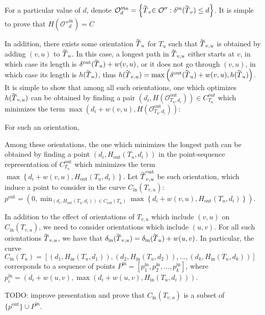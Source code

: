 For a particular value of $d$, denote $\mathcal{O}''^{\text{in}}_{d} = \left\{\tildeb{T}_v \in \mathcal{O}'': \delta^{\text{in}}(\tildeb{T}_v) \leq d\right\}$. It is simple to prove that $H\left(\mathcal{O}''^{\text{in}}_{d}\right) = C$


In addition, there exists some orientation $\tildeb{T}_u$ for $T_u$ such that $\tildeb{T}_{v,u}$  is obtained by adding $(v, u)$ to $\tildeb{T}_u$. In this case, a longest path in $\tildeb{T}_{v,u}$ either starts at $v$, in which case its length is $\delta^\text{out}(\tildeb{T}_u) + w(v,u)$, or it does not go through $(v,u)$, in which case its length is $h(\tildeb{T}_u)$, thus $h(\tildeb{T}_{v,u}) = \max\left(\delta^\text{out}(\tildeb{T}_u) + w(v,u), h(\tildeb{T}_u)\right)$. It is simple to show that among all such orientations, one which optimizes $h(\tildeb{T}_{v,u})$ can be obtained by finding a pair $(d_i, H(\mathcal{O}^\text{out}_{T_u, d_i})) \in C^{out}_{T_u}$ which minimizes the term $\max\left(d_i + w(v,u), H(\mathcal{O}^\text{out}_{T_u, d_i})\right)$:


For such an orientation, 


Among these orientations, the one which minimizes the longest path can be obtained by finding a point $(d_i, H_{\text{out}}(T_u, d_i))$ in the point-sequence representation of $C^\text{out}_{T_u}$ which minimizes the term $\max\left\{d_i + w(v,u), H_{\text{out}}(T_u, d_i)\right\}$. Let $\tildeb{T}^\text{out}_{v,u}$ be such orientation, which induce a point to consider in the curve $C_\text{in}(T_{v,u})$: $p^\text{out} = \left(0, \min_{(d_i, H_{\text{out}}(T_u, d_i)) \in C_\text{out}(T_u)}\max\left\{d_i + w(v,u), H_{\text{out}}(T_u, d_i)\right\}\right)$. 

In addition to the effect of orientations of $T_{v,u}$ which include $(v, u)$ on $C_\text{in}(T_{v,u})$, we need to consider orientations which include $(u, v)$. For all such orientations $\tildeb{T}_{v,u}$, we have that $\delta_{\text{in}}(\tildeb{T}_{v,u}) = \delta_{\text{in}}(\tildeb{T}_u) + w(u, v)$. In particular, the curve $C_\text{in}(T_u) = \left[(d_1, H_{\text{in}}(T_u, d_1)), (d_2, H_{\text{in}}(T_u, d_2)), \ldots, (d_k, H_{\text{in}}(T_u, d_k))\right]$ corresponds to a sequence of points $P^\text{in} = [p^\text{in}_1, p^\text{in}_2, \ldots, p^\text{in}_k]$, where $p^\text{in}_i = (d_i + w(u, v), \max\left(d_i + w(u, v), H_{\text{in}}(T_u, d_i)\right))$. 

TODO: improve presentation and prove that $C_\text{in}(T_{v,u})$ is a subset of $\{p^\text{out}\} \cup P^\text{in}$.

